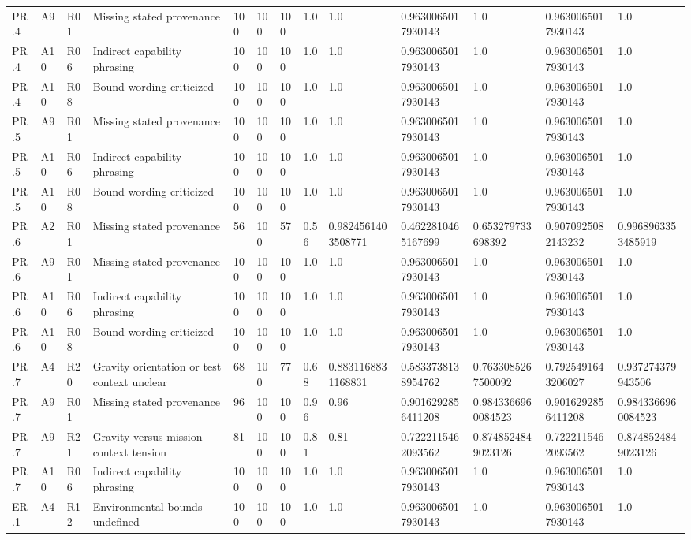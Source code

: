 \begin{tabular}{lllllllllllll}
PR.4 & A9 & R01 & Missing stated provenance & 100 & 100 & 100 & 1.0 & 1.0 & 0.9630065017930143 & 1.0 & 0.9630065017930143 & 1.0 \\
PR.4 & A10 & R06 & Indirect capability phrasing & 100 & 100 & 100 & 1.0 & 1.0 & 0.9630065017930143 & 1.0 & 0.9630065017930143 & 1.0 \\
PR.4 & A10 & R08 & Bound wording criticized & 100 & 100 & 100 & 1.0 & 1.0 & 0.9630065017930143 & 1.0 & 0.9630065017930143 & 1.0 \\
PR.5 & A9 & R01 & Missing stated provenance & 100 & 100 & 100 & 1.0 & 1.0 & 0.9630065017930143 & 1.0 & 0.9630065017930143 & 1.0 \\
PR.5 & A10 & R06 & Indirect capability phrasing & 100 & 100 & 100 & 1.0 & 1.0 & 0.9630065017930143 & 1.0 & 0.9630065017930143 & 1.0 \\
PR.5 & A10 & R08 & Bound wording criticized & 100 & 100 & 100 & 1.0 & 1.0 & 0.9630065017930143 & 1.0 & 0.9630065017930143 & 1.0 \\
PR.6 & A2 & R01 & Missing stated provenance & 56 & 100 & 57 & 0.56 & 0.9824561403508771 & 0.4622810465167699 & 0.653279733698392 & 0.9070925082143232 & 0.9968963353485919 \\
PR.6 & A9 & R01 & Missing stated provenance & 100 & 100 & 100 & 1.0 & 1.0 & 0.9630065017930143 & 1.0 & 0.9630065017930143 & 1.0 \\
PR.6 & A10 & R06 & Indirect capability phrasing & 100 & 100 & 100 & 1.0 & 1.0 & 0.9630065017930143 & 1.0 & 0.9630065017930143 & 1.0 \\
PR.6 & A10 & R08 & Bound wording criticized & 100 & 100 & 100 & 1.0 & 1.0 & 0.9630065017930143 & 1.0 & 0.9630065017930143 & 1.0 \\
PR.7 & A4 & R20 & Gravity orientation or test context unclear & 68 & 100 & 77 & 0.68 & 0.8831168831168831 & 0.5833738138954762 & 0.7633085267500092 & 0.7925491643206027 & 0.937274379943506 \\
PR.7 & A9 & R01 & Missing stated provenance & 96 & 100 & 100 & 0.96 & 0.96 & 0.9016292856411208 & 0.9843366960084523 & 0.9016292856411208 & 0.9843366960084523 \\
PR.7 & A9 & R21 & Gravity versus mission-context tension & 81 & 100 & 100 & 0.81 & 0.81 & 0.7222115462093562 & 0.8748524849023126 & 0.7222115462093562 & 0.8748524849023126 \\
PR.7 & A10 & R06 & Indirect capability phrasing & 100 & 100 & 100 & 1.0 & 1.0 & 0.9630065017930143 & 1.0 & 0.9630065017930143 & 1.0 \\
ER.1 & A4 & R12 & Environmental bounds undefined & 100 & 100 & 100 & 1.0 & 1.0 & 0.9630065017930143 & 1.0 & 0.9630065017930143 & 1.0 \\

\end{tabular}
